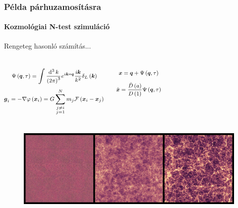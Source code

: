 \begin{frame}
\frametitle{Példa párhuzamosításra}
\framesubtitle{Kozmológiai N-test szimuláció}

\begin{block}{Rengeteg hasonló számítás...}
	\begin{columns}
		\begin{equation*}
			\footnotesize
			\Psi \left( \boldsymbol{q}, \tau \right)
			=
			\int \frac{\operatorname{d}^{3}{k}}{\left( 2 \pi \right)^{3}}
			e^{i \boldsymbol{k} * \boldsymbol{q}}
			\frac{i \boldsymbol{k}}{k^{2}}
			\delta_{L} \left( \boldsymbol{k} \right)
		\end{equation*}
		\begin{equation*}
			\footnotesize
			\boldsymbol{g}_{i}
			=
			- \nabla \phi \left( \boldsymbol{x}_{i} \right)
			=
			G
			\sum_{\mathclap{\substack{
				j \neq i \\
				j = 1
			}}}^{N} m_{j} \mathcal{F} \left( \boldsymbol{x}_{i} - \boldsymbol{x}_{j} \right)
		\end{equation*}

		\begin{equation*}
			\footnotesize
			\boldsymbol{x}
			=
			\boldsymbol{q} + \Psi \left( \boldsymbol{q}, \tau \right)
		\end{equation*}
		\begin{equation*}
			\footnotesize
			\dot{\boldsymbol{x}}
			=
			\frac{\dot{D} \left( a \right)}{D \left( 1 \right)} \Psi \left( \boldsymbol{q}, \tau \right)
		\end{equation*}
	\end{columns}
\end{block}

\begin{figure}
	\includegraphics[width=\textwidth]{img/shaded_evolution_N65536_M2_L200_noframe.jpg}
\end{figure}

\end{frame}